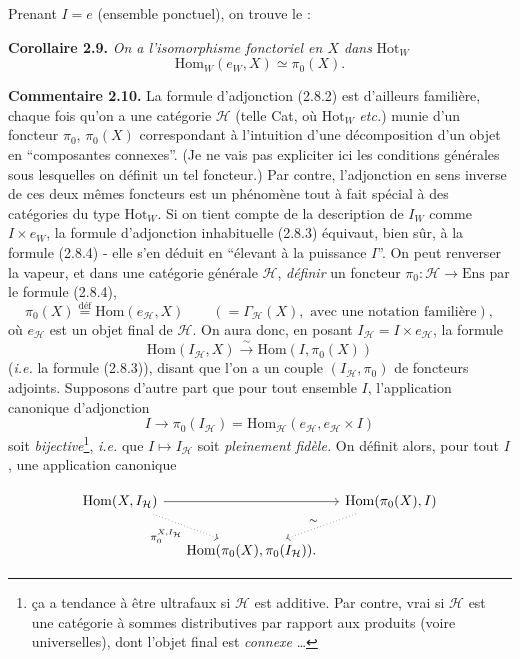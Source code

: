 \documentclass[11pt]{article}
\newcommand{\printedpage}[1]{\marginpar{\footnotesize p.~#1}}
\newcommand{\msp}[1]{\marginpar{\footnotesize [#1]}}
\newcommand{\Hom}{\operatorname{Hom}}
\begin{document}
Prenant $I = e$ (ensemble ponctuel), on trouve le :

\textbf{Corollaire 2.9.} \textit{On a l'isomorphisme fonctoriel en $X$ dans} $\mathrm{Hot}_W$
\[
\boxed{\mathrm{Hom}_W(e_W, X) \simeq \pi_0(X).} \tag*{(2.8.4)}
\]

\textbf{Commentaire 2.10.} La formule d'adjonction (2.8.2) est d'ailleurs familière, chaque fois qu'on a une catégorie $\mathcal{H}$ (telle Cat, où $\mathrm{Hot}_W$ \textit{etc.}) %
munie d'un foncteur $\pi_0$, $\pi_0(X)$ correspondant à l'intuition d'une décomposition d'un objet en “composantes connexes”. (Je ne vais pas expliciter ici les conditions générales sous lesquelles on définit un tel foncteur.) Par contre, l'adjonction en sens inverse de ces deux mêmes foncteurs est un phénomène tout à fait spécial à des catégories \msp{page 16}du type $\mathrm{Hot}_W$. Si on tient compte de la description de $I_W$ comme $I \times e_W$, la formule d'adjonction inhabituelle (2.8.3) équivaut, bien sûr, à la formule (2.8.4) - elle s'en déduit en “élevant à la puissance $I$”. On peut renverser la vapeur, et dans une catégorie générale $\mathcal{H}$, \textit{définir} un foncteur $\pi_0 : \mathcal{H} \longrightarrow \mathrm{Ens}$ par le formule (2.8.4), %
\[
\pi_0(X) \overset{\text{déf}}{=} \mathrm{Hom}(e_{\mathcal{H}}, X) \qquad (= \Gamma_{\mathcal{H}}(X), \text{ avec une notation familière}),
\]
où $e_{\mathcal{H}}$ est un objet final de $\mathcal{H}$. On aura donc, en posant $I_{\mathcal{H}} = I \times e_{\mathcal{H}}$, la formule
\[
\mathrm{Hom}(I_{\mathcal{H}}, X) \xrightarrow{\ \sim\ } \mathrm{Hom}(I, \pi_0(X))
\]
(\textit{i.e.} la formule (2.8.3)), disant que l'on a un couple $(I_{\mathcal{H}}, \pi_0)$ de foncteurs adjoints. Supposons d'autre part que pour tout ensemble $I$, l'application canonique d'adjonction
\[
I \longrightarrow \pi_0(I_{\mathcal{H}}) = \mathrm{Hom}_{\mathcal{H}}(e_{\mathcal{H}}, e_{\mathcal{H}} \times I)
\]
soit \textit{bijective}\footnote{ça a tendance à être ultrafaux si $\mathcal{H}$ est additive. Par contre, vrai si $\mathcal{H}$ est une catégorie à sommes distributives par rapport aux produits (voire universelles), dont l'objet final est \textit{connexe} \ldots}, \textit{i.e.} que $I \longmapsto I_{\mathcal{H}}$ soit \textit{pleinement fidèle.} On définit alors, pour tout $I$, une application canonique

\printedpage{9}

\[
\begin{tikzcd}[column sep=small]
\Hom(X,I_{\mathcal{H}}) \arrow[rr] \arrow[dr,dotted,"\pi_0^{X,I_{\mathcal{H}}}"'] & & \Hom(\pi_0(X),I) \arrow[dl,dotted,"\sim"'] \\ %
& \Hom(\pi_0(X),\pi_0(I_{\mathcal{H}})). &
\end{tikzcd}
\]
\end{document}
